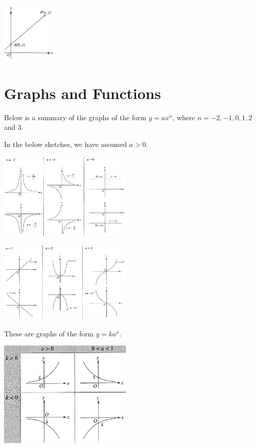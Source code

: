 \documentclass[twocolumn]{article}
\begin{document}
\begin{enumerate}
\begin{itemize}
\includegraphics[width=0.2\textwidth]{16.png}


\end{itemize} 

\section*{Graphs and Functions}

Below is a summary of the graphs of the form $y=a x^n$, where $n=-2,-1,0,1,2$ and 3.

In the below sketches, we have assumed $a > 0$.

\includegraphics[width=0.48\textwidth]{09.png}

\includegraphics[width=0.48\textwidth]{10.png}

\bigskip 

\noindent 
These are graphs of the form $y = ka^x$.

\includegraphics[width=0.48\textwidth]{11.png}


\end{enumerate}
\end{document}
